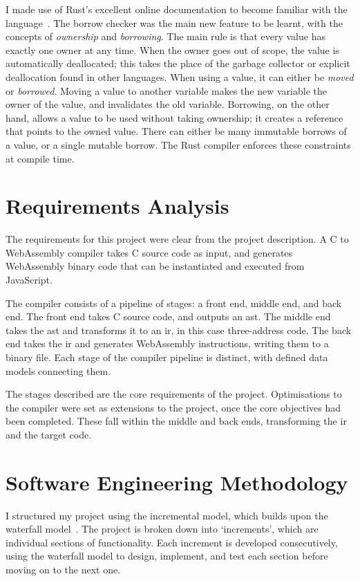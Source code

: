 \documentclass[00-main.tex]{subfiles}
\begin{document}
I made use of Rust's excellent online documentation to become familiar with the language~.
The borrow checker was the main new feature to be learnt, with the concepts of \emph{ownership} and \emph{borrowing}.
The main rule is that every value has exactly one owner at any time.
When the owner goes out of scope, the value is automatically deallocated; this takes the place of the garbage collector or explicit deallocation found in other languages.
When using a value, it can either be \emph{moved} or \emph{borrowed}.
Moving a value to another variable makes the new variable the owner of the value, and invalidates the old variable.
Borrowing, on the other hand, allows a value to be used without taking ownership; it creates a reference that points to the owned value.
There can either be many immutable borrows of a value, or a single mutable borrow.
The Rust compiler enforces these constraints at compile time.

\section{Requirements Analysis}

The requirements for this project were clear from the project description.
A C to WebAssembly compiler takes C source code as input, and generates WebAssembly binary code that can be instantiated and executed from JavaScript.

The compiler consists of a pipeline of stages: a front end, middle end, and back end.
The front end takes C source code, and outputs an \gls{ast}.
The middle end takes the \gls{ast} and transforms it to an \gls{ir}, in this case three-address code.
The back end takes the \gls{ir} and generates WebAssembly instructions, writing them to a binary file.
Each stage of the compiler pipeline is distinct, with defined data models connecting them.

The stages described are the core requirements of the project.
Optimisations to the compiler were set as extensions to the project, once the core objectives had been completed.
These fall within the middle and back ends, transforming the \gls{ir} and the target code.



\section{Software Engineering Methodology}

I structured my project using the incremental model, which builds upon the waterfall model~.
The project is broken down into `increments', which are individual sections of functionality.
Each increment is developed consecutively, using the waterfall model to design, implement, and test each section before moving on to the next one.
\end{document}
